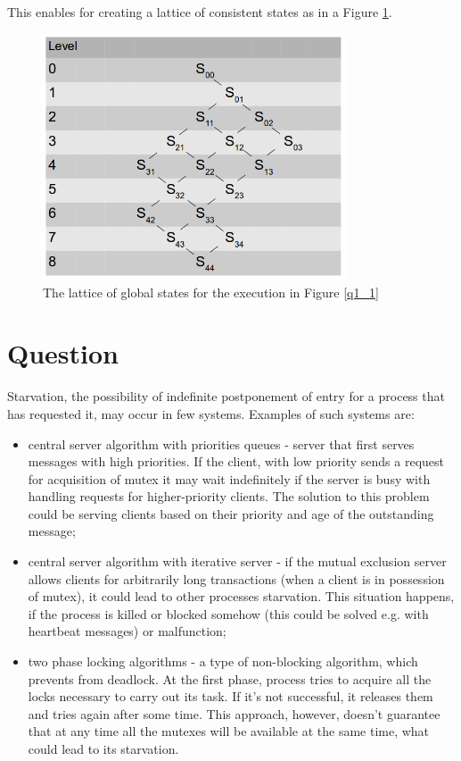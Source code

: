 \documentclass[paper=a4, fontsize=11pt]{scrartcl} %
\numberwithin{equation}{section} %
\numberwithin{figure}{section} %
\numberwithin{table}{section} %
\begin{document}
This enables for creating a lattice of consistent states as in a Figure \ref{q1_3}.

\begin{figure}[ht!]
\centering
\includegraphics[width=90mm]{q1_3.png}
\caption{The lattice of global states for the execution in Figure \ref{q1_1}}
\label{q1_3}
\end{figure}




\section{Question}

Starvation, the possibility of indefinite postponement of entry for a process that has requested it, may occur in few systems. Examples of such systems are:
\begin{itemize}
\item central server algorithm with priorities queues - server that first serves messages with high priorities. If the client, with low priority sends a request for acquisition of mutex it may wait indefinitely if the server is busy with handling requests for higher-priority clients. The solution to this problem could be serving clients based on their priority and age of the outstanding message;
\item central server algorithm with iterative server - if the mutual exclusion server allows clients for arbitrarily long transactions (when a client is in possession of mutex), it could lead to other processes starvation. This situation happens, if the process is killed or blocked somehow (this could be solved e.g. with heartbeat messages) or malfunction; 
\item two phase locking algorithms - a type of non-blocking algorithm, which prevents from deadlock. At the first phase, process tries to acquire all the locks necessary to carry out its task. If it's not successful, it releases them and tries again after some time. This approach, however, doesn't guarantee that at any time all the mutexes will be available at the same time, what could lead to its starvation.
\end{itemize}
\end{document}
